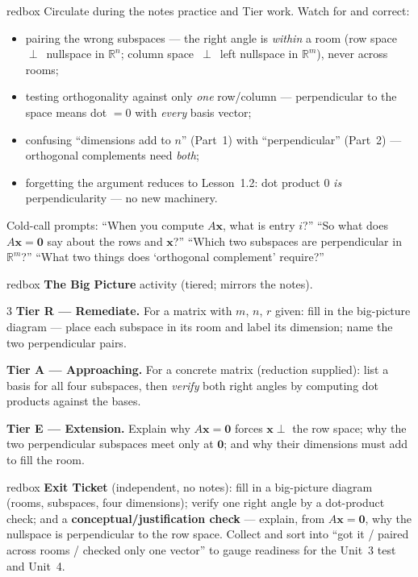 \documentclass[10pt]{article}
\newcommand{\xx}{\mathbf{x}}
\newcommand{\zero}{\mathbf{0}}
\begin{document}
\begin{skillbox}{redbox}
Circulate during the notes practice and Tier work. Watch for and correct:
\begin{itemize}[leftmargin=1.2em, nosep]
  \item pairing the wrong subspaces --- the right angle is \emph{within} a room (row space~$\perp$~nullspace in $\mathbb{R}^n$; column space~$\perp$~left nullspace in $\mathbb{R}^m$), never across rooms;
  \item testing orthogonality against only \emph{one} row/column --- perpendicular to the space means dot $=0$ with \emph{every} basis vector;
  \item confusing ``dimensions add to $n$'' (Part~1) with ``perpendicular'' (Part~2) --- orthogonal complements need \emph{both};
  \item forgetting the argument reduces to Lesson~1.2: dot product $0$ \emph{is} perpendicularity --- no new machinery.
\end{itemize}
Cold-call prompts: ``When you compute $A\xx$, what is entry $i$?'' ``So what does $A\xx=\zero$ say about the
rows and $\xx$?'' ``Which two subspaces are perpendicular in $\mathbb{R}^m$?'' ``What two things does
`orthogonal complement' require?''
\end{skillbox}

\begin{skillbox}{redbox}
\textbf{The Big Picture} activity (tiered; mirrors the notes).
\begin{multicols}{3}
\textbf{Tier R --- Remediate.} For a matrix with $m$, $n$, $r$ given: fill in the big-picture diagram ---
place each subspace in its room and label its dimension; name the two perpendicular pairs.

\columnbreak
\textbf{Tier A --- Approaching.} For a concrete matrix (reduction supplied): list a basis for all four
subspaces, then \emph{verify} both right angles by computing dot products against the bases.

\columnbreak
\textbf{Tier E --- Extension.} Explain why $A\xx=\zero$ forces $\xx\perp$ the row space; why the two
perpendicular subspaces meet only at $\zero$; and why their dimensions must add to fill the room.
\end{multicols}
\end{skillbox}

\begin{skillbox}{redbox}
\textbf{Exit Ticket} (independent, no notes): fill in a big-picture diagram (rooms, subspaces, four
dimensions); verify one right angle by a dot-product check; and a \textbf{conceptual/justification check} ---
explain, from $A\xx=\zero$, why the nullspace is perpendicular to the row space. Collect and sort into ``got
it / paired across rooms / checked only one vector'' to gauge readiness for the Unit~3 test and Unit~4.
\end{skillbox}
\end{document}

